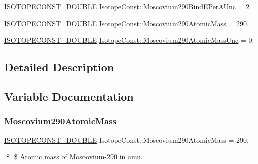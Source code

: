 \begin{DoxyCompactItemize}
\mbox{\hyperlink{group___isotope_const-_macros_ga8f45a7272ce02c0b4c65c44636ed719a}{I\+S\+O\+T\+O\+P\+E\+C\+O\+N\+S\+T\+\_\+\+D\+O\+U\+B\+LE}} \mbox{\hyperlink{group___isotope_const-_moscovium-_mc290_gaf2cb9b2b7899740a6d5293a7e7ec717d}{Isotope\+Const\+::\+Moscovium290\+Bind\+E\+Per\+A\+Unc}} = 2
\item 
\mbox{\hyperlink{group___isotope_const-_macros_ga8f45a7272ce02c0b4c65c44636ed719a}{I\+S\+O\+T\+O\+P\+E\+C\+O\+N\+S\+T\+\_\+\+D\+O\+U\+B\+LE}} \mbox{\hyperlink{group___isotope_const-_moscovium-_mc290_ga05f94500372012c43ad7668e572694dd}{Isotope\+Const\+::\+Moscovium290\+Atomic\+Mass}} = 290.
\item 
\mbox{\hyperlink{group___isotope_const-_macros_ga8f45a7272ce02c0b4c65c44636ed719a}{I\+S\+O\+T\+O\+P\+E\+C\+O\+N\+S\+T\+\_\+\+D\+O\+U\+B\+LE}} \mbox{\hyperlink{group___isotope_const-_moscovium-_mc290_gaf65aa7ababb940527b48832e77974172}{Isotope\+Const\+::\+Moscovium290\+Atomic\+Mass\+Unc}} = 0.
\end{DoxyCompactItemize}


\subsection{Detailed Description}


\subsection{Variable Documentation}
\mbox{\label{group___isotope_const-_moscovium-_mc290_ga05f94500372012c43ad7668e572694dd}} 
\subsubsection{\texorpdfstring{Moscovium290\+Atomic\+Mass}{Moscovium290AtomicMass}}
{\footnotesize\ttfamily \mbox{\hyperlink{group___isotope_const-_macros_ga8f45a7272ce02c0b4c65c44636ed719a}{I\+S\+O\+T\+O\+P\+E\+C\+O\+N\+S\+T\+\_\+\+D\+O\+U\+B\+LE}} Isotope\+Const\+::\+Moscovium290\+Atomic\+Mass = 290.}

\$ \$ Atomic mass of Moscovium-\/290 in amu. \mbox{\label{group___isotope_const-_moscovium-_mc290_gaf65aa7ababb940527b48832e77974172}} 
